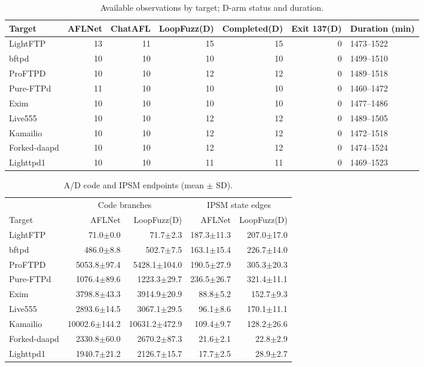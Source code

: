 \begin{table}[!tbp]
\centering\small
\caption{Available observations by target; D-arm status and duration.}
\label{tab:observed_inventory}
\begin{tabular}{lrrrrrl}
\toprule
Target & AFLNet & ChatAFL & LoopFuzz(D) & Completed(D) & Exit 137(D) & Duration (min) \\
\midrule
LightFTP & 13 & 11 & 15 & 15 & 0 & 1473--1522 \\
bftpd & 10 & 10 & 10 & 10 & 0 & 1499--1510 \\
ProFTPD & 10 & 10 & 12 & 12 & 0 & 1489--1518 \\
Pure-FTPd & 11 & 10 & 10 & 10 & 0 & 1460--1472 \\
Exim & 10 & 10 & 10 & 10 & 0 & 1477--1486 \\
Live555 & 10 & 10 & 12 & 12 & 0 & 1489--1505 \\
Kamailio & 10 & 10 & 12 & 12 & 0 & 1472--1518 \\
Forked-daapd & 10 & 10 & 12 & 12 & 0 & 1474--1524 \\
Lighttpd1 & 10 & 10 & 11 & 11 & 0 & 1469--1523 \\
\bottomrule
\end{tabular}
\end{table}
\begin{table}[!tbp]
\centering\small
\caption{A/D code and IPSM endpoints (mean $\pm$ SD).}
\label{tab:observed_endpoints}
\begin{tabular}{lrrrr}
\toprule
 & \multicolumn{2}{c}{Code branches} & \multicolumn{2}{c}{IPSM state edges} \\
Target & AFLNet & LoopFuzz(D) & AFLNet & LoopFuzz(D) \\
\midrule
LightFTP & 71.0$\pm$0.0 & 71.7$\pm$2.3 & 187.3$\pm$11.3 & 207.0$\pm$17.0 \\
bftpd & 486.0$\pm$8.8 & 502.7$\pm$7.5 & 163.1$\pm$15.4 & 226.7$\pm$14.0 \\
ProFTPD & 5053.8$\pm$97.4 & 5428.1$\pm$104.0 & 190.5$\pm$27.9 & 305.3$\pm$20.3 \\
Pure-FTPd & 1076.4$\pm$89.6 & 1223.3$\pm$29.7 & 236.5$\pm$26.7 & 321.4$\pm$11.1 \\
Exim & 3798.8$\pm$43.3 & 3914.9$\pm$20.9 & 88.8$\pm$5.2 & 152.7$\pm$9.3 \\
Live555 & 2893.6$\pm$14.5 & 3067.1$\pm$29.5 & 96.1$\pm$8.6 & 170.1$\pm$11.1 \\
Kamailio & 10002.6$\pm$144.2 & 10631.2$\pm$472.9 & 109.4$\pm$9.7 & 128.2$\pm$26.6 \\
Forked-daapd & 2330.8$\pm$60.0 & 2670.2$\pm$87.3 & 21.6$\pm$2.1 & 22.8$\pm$2.9 \\
Lighttpd1 & 1940.7$\pm$21.2 & 2126.7$\pm$15.7 & 17.7$\pm$2.5 & 28.9$\pm$2.7 \\
\bottomrule
\end{tabular}
\end{table}
